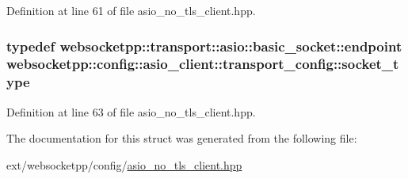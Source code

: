 Definition at line 61 of file asio\+\_\+no\+\_\+tls\+\_\+client.\+hpp.

\hypertarget{structwebsocketpp_1_1config_1_1asio__client_1_1transport__config_abf6209c3fcb8d3705036441ca16e23c6}{}
\subsubsection[{socket\+\_\+type}]{\setlength{\rightskip}{0pt plus 5cm}typedef {\bf websocketpp\+::transport\+::asio\+::basic\+\_\+socket\+::endpoint} {\bf websocketpp\+::config\+::asio\+\_\+client\+::transport\+\_\+config\+::socket\+\_\+type}}\label{structwebsocketpp_1_1config_1_1asio__client_1_1transport__config_abf6209c3fcb8d3705036441ca16e23c6}


Definition at line 63 of file asio\+\_\+no\+\_\+tls\+\_\+client.\+hpp.



The documentation for this struct was generated from the following file\+:\begin{DoxyCompactItemize}
\item 
ext/websocketpp/config/\hyperlink{asio__no__tls__client_8hpp}{asio\+\_\+no\+\_\+tls\+\_\+client.\+hpp}\end{DoxyCompactItemize}
